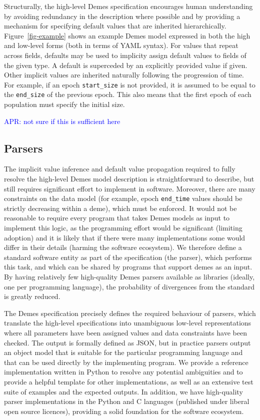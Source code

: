 \documentclass[11pt]{article}
\newcommand{\aprcomment}[1]{{\textcolor{blue}{APR: #1}}}
\begin{document}
Structurally, the high-level Demes specification encourages human understanding
by avoiding redundancy in the description where possible and by providing a
mechanism for specifying default values that are inherited hierarchically.
Figure~\ref{fig-example} shows an example Demes model expressed in both the
high and low-level forms (both in terms of YAML syntax). For values that repeat
across fields, defaults may be used to implicity assign default values to
fields of the given type.  A default is superceded by an explicitly provided
value if given. Other implicit values are inherited naturally following the
progression of time. For example, if an epoch \texttt{start\_size} is not
provided, it is assumed to be equal to the \texttt{end\_size} of the previous
epoch. This also means that the first epoch of each population must specify the
initial size.

\aprcomment{not sure if this is sufficient here}

\subsection*{Parsers}
The implicit value inference and default value propagation required to
fully resolve the high-level Demes model description is straightforward
to describe, but still requires significant effort to implement in
software. Moreover, there are many constraints on the data model
(for example, epoch \texttt{end\_time} values should be strictly decreasing
within a deme), which must be enforced.
It would not be reasonable to require every program that
takes Demes models as input to implement this logic, as the programming
effort would be significant (limiting adoption)
and it is likely that if there were many implementations some would differ
in their details (harming the software ecosystem). We therefore define
a standard software entity as part of the specification (the parser),
which performs this task, and which can be shared by programs that
support demes as an input. By having relatively few high-quality Demes
parsers available as libraries (ideally, one per programming language),
the probability of divergences from the standard is greatly reduced.

The Demes specification precisely defines the required behaviour of parsers,
which translate the high-level specifications into unambiguous low-level
representations where all parameters have been assigned values and data
constraints have been checked. The output is formally defined as JSON, but in
practice parsers output an object model that is suitable for the particular
programming language and that can be used directly by the implementing program.
We provide a reference implementation written in Python to resolve any
potential ambiguities and to provide a helpful template for other
implementations, as well as an extensive test suite of examples and the
expected outputs. In addition, we have high-quality parser implementations in
the Python and C languages (published under liberal open source licences),
providing a solid foundation for the software ecosystem.
\end{document}
